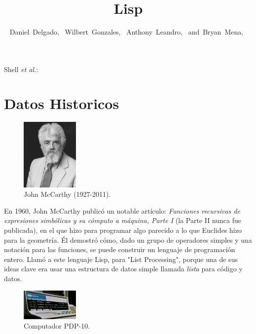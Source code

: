 \documentclass[10pt,journal,compsoc]{IEEEtran}
\begin{document}
\title{Lisp}

\author{Daniel~Delgado,~
	Wilbert~Gonzales,~
	Anthony~Leandro,~
	and~Bryan~Mena,~
}
{Shell \MakeLowercase{\textit{et al.}}: \LaTex}


\maketitle

\IEEEdisplaynontitleabstractindextext

\IEEEpeerreviewmaketitle

\section{Datos Historicos}
\begin{figure}
	\centering
	\includegraphics[width=0.25\textwidth]{mccarthy.jpg}
	\caption{\label{fig:JohnMcCarthy}John McCarthy (1927-2011).}
\end{figure}
En 1960, John McCarthy public\'o un notable art\'iculo: \emph{Funciones recursivas de expresiones simb\'olicas y su c\'omputo a m\'aquina, Parte I} (la Parte II nunca fue publicada), en el que  hizo para programar algo parecido a lo que Euclides hizo para la geometr\'ia. \'El demostr\'o c\'omo, dado un grupo de operadores simples y una notaci\'on para las funciones, se puede construir un lenguaje de programaci\'on entero. Llam\'o a este lenguaje Lisp, para "List Processing", porque una de sus ideas clave era usar una estructura de datos simple llamada \emph{lista} para c\'odigo y datos. 

\begin{figure}
	\centering
	\includegraphics[width=0.25\textwidth]{pdp.jpg}
	\caption{\label{fig:PDP-10}Computador PDP-10.}
\end{figure}
\end{document}
